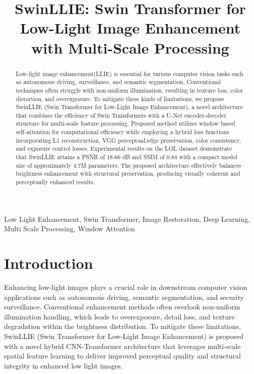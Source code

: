 \documentclass[conference]{IEEEtran}
\begin{document}
\title{SwinLLIE: Swin Transformer for Low-Light Image Enhancement with Multi-Scale Processing}

\maketitle

\begin{abstract}
Low-light image enhancement(LLIE) is essential for various computer vision tasks such as autonomous driving, surveillance, and semantic segmentation. Conventional techniques often struggle with non-uniform illumination, resulting in texture loss, color distortion, and overexposure. To mitigate these kinds of limitations, we propose SwinLLIE (Swin Transformer for Low-Light Image Enhancement), a novel architecture that combines the efficiency of Swin Transformers with a U-Net encoder-decoder structure for multi-scale feature processing. Proposed method utilizes window based self-attention for computational efficiency while employing a hybrid loss functions incorporating L1 reconstruction, VGG perceptual,edge preservation, color consistency, and exposure control losses. Experimental results on the LOL dataset demonstrate that SwinLLIE attains a PSNR of 18.66 dB and SSIM of 0.84 with a compact model size of approximately 4.7M parameters. The proposed architecture effectively balances brightness enhancement with structural preservation, producing visually coherent and perceptually enhanced results.
\end{abstract}

\begin{IEEEkeywords}
Low Light Enhancement, Swin Transformer, Image Restoration, Deep Learning, Multi Scale Processing, Window Attention
\end{IEEEkeywords}

\section{Introduction}

Enhancing low-light images plays a crucial role in downstream computer vision applications such as autonomous driving, semantic segmentation, and security surveillance. Conventional enhancement methods often overlook non-uniform illumination handling, which leads to overexposure, detail loss, and texture degradation within the brightness distribution. To mitigate these limitations, SwinLLIE (Swin Transformer for Low-Light Image Enhancement) is proposed with a novel hybrid CNN-Transformer architecture that leverages multi-scale spatial feature learning to deliver improved perceptual quality and structural integrity in enhanced low light images.
\end{document}
